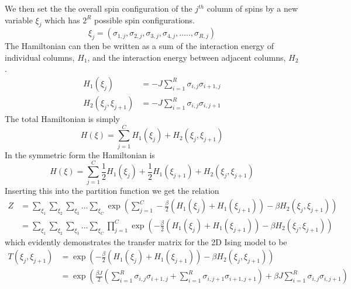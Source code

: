 %
We then set the the overall spin configuration of the $j^{th}$ column of spins by a new variable $\xi_{j}$ which has $2^{R}$ possible spin configurations.
%
\begin{equation}
\xi_{j}=\left(\sigma_{1,j},\sigma_{2,j},\sigma_{3,j},\sigma_{4,j},.....,\sigma_{R,j}\right)
\end{equation}
%
The Hamiltonian can then be written as a sum of the interaction energy of individual columns, $H_{1}$, and the interaction energy between adjacent columns, $H_{2}$.
%
\begin{align}
H_{1}\left(\xi_{j}\right)&=-J\sum_{i=1}^{R}\sigma_{i,j}\sigma_{i+1,j}\\
H_{2}\left(\xi_{j},\xi_{j+1}\right)&=-J\sum_{i=1}^{R}\sigma_{i,j}\sigma_{i,j+1}
\end{align}
%
The total Hamiltonian is simply
%
\begin{equation}
H\left(\xi\right)=\sum^{C}_{j=1}H_{1}\left(\xi_{j}\right) + H_{2}\left(\xi_{j},\xi_{j+1} \right)
\end{equation}
%
In the symmetric form the Hamiltonian is
%
\begin{equation}
H\left(\xi\right)= \sum^{C}_{j=1}\frac{1}{2} H_{1} \left(\xi_{j}\right) +\frac{1}{2} H_{1}\left( \xi_{j+1}\right) +  H_{2}\left(\xi_{j},\xi_{j+1} \right)
\end{equation}
%
Inserting this into the partition function  we get the relation
%
\begin{align}
Z&=\sum_{\xi_1}\sum_{\xi_2}\sum_{\xi_3}...\sum_{\xi_C}\exp\left(\sum^{C}_{j=1}-\frac{\beta}{2}\left( H_{1}\left(\xi_{j}\right) +H_{1}\left( \xi_{j+1}\right)\right) -  \beta H_{2}\left(\xi_{j},\xi_{j+1} \right) \right)\nonumber\\
&=\sum_{\xi_1}\sum_{\xi_2}\sum_{\xi_3}...\sum_{\xi_C}\prod_{j=1}^{C}\exp\left( -\frac{\beta}{2}\left( H_{1}\left(\xi_{j}\right) + H_{1}\left(\xi_{j+1}\right)\right) -  \beta H_{2}\left(\xi_{j},\xi_{j+1} \right) \right)
\end{align}
%
which evidently demonstrates the transfer matrix for the 2D Ising model to be
%
\begin{align}
T\left(\xi_j,\xi_{j+1}\right)&= \exp\left( -\frac{\beta}{2}\left( H_{1}\left(\xi_{j}\right) + H_{1}\left(\xi_{j+1}\right)\right) -  \beta H_{2}\left(\xi_{j},\xi_{j+1} \right) \right) \nonumber\\
&=\exp\left( \frac{\beta J}{2}\left( \sum_{i=1}^{R}\sigma_{i,j}\sigma_{i+1,j}   +   \sum_{i=1}^{R}\sigma_{i,j+1}\sigma_{i+1,j+1} \right) + \beta J\sum^{R}_{i=1}\sigma_{i,j}\sigma_{i,j+1} \right)
\end{align}
